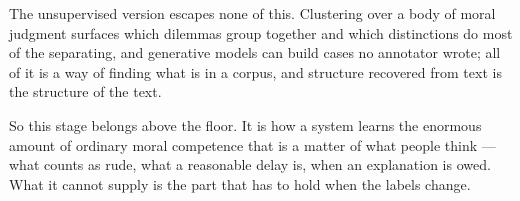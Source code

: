 The unsupervised version escapes none of this. Clustering over a body of moral judgment surfaces which dilemmas group together and which distinctions do most of the separating, and generative models can build cases no annotator wrote; all of it is a way of finding what is in a corpus, and structure recovered from text is the structure of the text.

So this stage belongs above the floor. It is how a system learns the enormous amount of ordinary moral competence that is a matter of what people think — what counts as rude, what a reasonable delay is, when an explanation is owed. What it cannot supply is the part that has to hold when the labels change.
